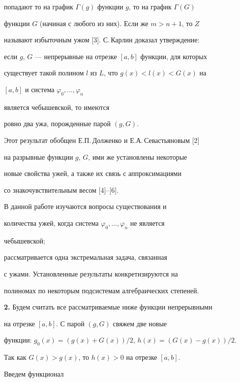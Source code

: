 попадают то на график $\Gamma(g)$ функции $g$, то на график $\Gamma(G)$ 


функции $G$ (начиная с любого из них). Если же $m>n+1$, то $Z$ 


называют избыточным ужом [3]. С.\,Карлин доказал утверждение: 


если $g$, $G$ --- непрерывные на отрезке $[a,b]$ функции, для которых 


существует такой полином $l$ из $L$, что $g(x)<l(x)<G(x)$ на 


$[a,b]$ и система $\varphi_0,\dotsc,\varphi_n$ 


является чебышевской, то имеются 


ровно два ужа, порожденные парой $(g,G)$. 


 


Этот результат обобщен Е.П.\,Долженко и Е.А.\,Севастьяновым [2] 


на разрывные функции $g$, $G$, ими же установлены некоторые 


новые свойства ужей, а также их связь с аппроксимациями 


со знакочувствительным весом [4]--[6]. 


 


В данной работе изучаются вопросы существования и 


количества ужей, когда система $\varphi_0,\dotsc,\varphi_n$ не является 


чебышевской; 


рассматривается одна экстремальная задача, связанная 


с ужами. Установленные результаты конкретизируются на 


полиномах по некоторым подсистемам алгебраических степеней. 


\medskip 


 


{\bf 2.} Будем считать все рассматриваемые ниже функции непрерывными 


на отрезке $[a,b]$. С парой $(g,G)$ свяжем две новые 


функции: $g_0(x)=(g(x)+G(x))/2$, $h(x)=(G(x)-g(x))/2$. 


Так как $G(x)>g(x)$, то $h(x)>0$ на отрезке $[a,b]$. 


 


Введем функционал 


$$ 


